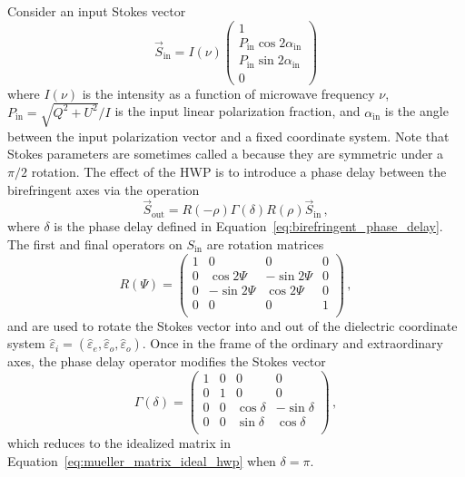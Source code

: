Consider an input Stokes vector
\begin{equation}
    \vec{S}_{\mathrm{in}}
    =
    I(\nu) 
    \begin{pmatrix}
    1 \\
    P_{\mathrm{in}} \cos 2 \alpha_{\mathrm{in}} \\ P_{\mathrm{in}} \sin 2 \alpha_{\mathrm{in}} \\
    0
    \end{pmatrix}
    \label{eq:mueller_matrix_Sin}
\end{equation}
where $I(\nu)$ is the intensity as a function of microwave frequency $\nu$, $P_{\mathrm{in}} = \sqrt{Q^{2} + U^{2}} / I$ is the input linear polarization fraction, and $\alpha_{\mathrm{in}}$ is the angle between the input polarization vector and a fixed coordinate system. Note that Stokes parameters are sometimes called a  because they are symmetric under a $\pi / 2$ rotation. The effect of the HWP is to introduce a phase delay between the birefringent axes via the operation
\begin{equation}
    \vec{S}_{\mathrm{out}} = R(- \rho) \Gamma ( \delta) R(\rho) \vec{S}_{\mathrm{in}} \, ,
    \label{eq:single_hwp_mueller_matrix_operation}
\end{equation}
where $\delta$ is the phase delay defined in Equation~\ref{eq:birefringent_phase_delay}. The first and final operators on $S_{\mathrm{in}}$ are rotation matrices
\begin{equation}
    R(\Psi)
    =
    \begin{pmatrix}
    1 & 0 & 0 & 0 \\
    0 & \cos 2 \Psi & - \sin 2 \Psi & 0 \\
    0 & - \sin 2 \Psi & \cos 2 \Psi & 0 \\
    0 & 0 & 0 & 1 \\
    \end{pmatrix} \, ,
    \label{eq:rotation_mueller_matrix}
\end{equation}
and are used to rotate the Stokes vector into and out of the dielectric coordinate system $\hat{\varepsilon}_{i} = (\hat{\varepsilon}_{e}, \hat{\varepsilon}_{o}, \hat{\varepsilon}_{o})$. Once in the frame of the ordinary and extraordinary axes, the phase delay operator modifies the Stokes vector
\begin{equation}
    \Gamma(\delta)
    =
    \begin{pmatrix}
    1 & 0 & 0 & 0 \\
    0 & 1 & 0 & 0 \\
    0 & 0 & \cos \delta & -\sin \delta \\
    0 & 0 & \sin \delta & \cos \delta \\
    \end{pmatrix} \, ,
    \label{eq:mueller_phase_delay_matrix}
\end{equation}
which reduces to the idealized matrix in Equation~\ref{eq:mueller_matrix_ideal_hwp} when $\delta = \pi$.

